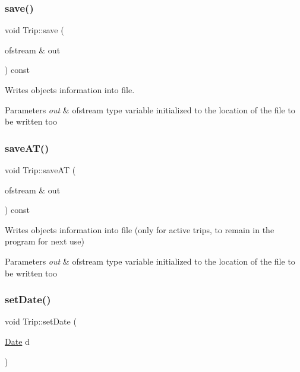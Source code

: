 \subsubsection{\texorpdfstring{save()}{save()}}
{\footnotesize\ttfamily void Trip\+::save (\begin{DoxyParamCaption}\item[{ofstream \&}]{out }\end{DoxyParamCaption}) const}



Writes object\textquotesingle{}s information into file. 


\begin{DoxyParams}{Parameters}
{\em out} & ofstream type variable initialized to the location of the file to be written too \\
\hline
\end{DoxyParams}
\mbox{\label{group___trip_gafcf569c0a9d6e5a47134f7e9dd62334a}} 
\subsubsection{\texorpdfstring{save\+A\+T()}{saveAT()}}
{\footnotesize\ttfamily void Trip\+::save\+AT (\begin{DoxyParamCaption}\item[{ofstream \&}]{out }\end{DoxyParamCaption}) const}



Writes object\textquotesingle{}s information into file (only for active trips, to remain in the program for next use) 


\begin{DoxyParams}{Parameters}
{\em out} & ofstream type variable initialized to the location of the file to be written too \\
\hline
\end{DoxyParams}
\mbox{\label{group___trip_ga26abc8edc0cb1f5c2eb1b6e292152701}} 
\subsubsection{\texorpdfstring{set\+Date()}{setDate()}}
{\footnotesize\ttfamily void Trip\+::set\+Date (\begin{DoxyParamCaption}\item[{\hyperlink{class_date}{Date}}]{d }\end{DoxyParamCaption})}



